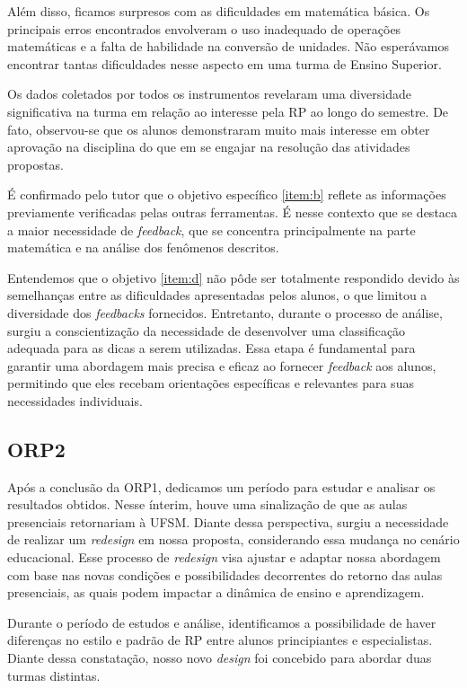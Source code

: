 Além disso, ficamos surpresos com as dificuldades em matemática básica. Os principais erros encontrados envolveram o uso inadequado de operações matemáticas e a falta de habilidade na conversão de unidades. Não esperávamos encontrar tantas dificuldades nesse aspecto em uma turma de Ensino Superior.

Os dados coletados por todos os instrumentos revelaram uma diversidade significativa na turma em relação ao interesse pela RP ao longo do semestre. De fato, observou-se que os alunos demonstraram muito mais interesse em obter aprovação na disciplina do que em se engajar na resolução das atividades propostas.

É confirmado pelo tutor que o objetivo específico \ref{item:b} reflete as informações previamente verificadas pelas outras ferramentas. É nesse contexto que se destaca a maior necessidade de \textit{feedback}, que se concentra principalmente na parte matemática e na análise dos fenômenos descritos.

Entendemos que o objetivo \ref{item:d} não pôde ser totalmente respondido devido às semelhanças entre as dificuldades apresentadas pelos alunos, o que limitou a diversidade dos \textit{feedbacks} fornecidos. Entretanto, durante o processo de análise, surgiu a conscientização da necessidade de desenvolver uma classificação adequada para as dicas a serem utilizadas. Essa etapa é fundamental para garantir uma abordagem mais precisa e eficaz ao fornecer \textit{feedback} aos alunos, permitindo que eles recebam orientações específicas e relevantes para suas necessidades individuais.


\subsection{ORP2} \label{sec:2orp}

Após a conclusão da ORP1, dedicamos um período para estudar e analisar os resultados obtidos. Nesse ínterim, houve uma sinalização de que as aulas presenciais retornariam à UFSM. Diante dessa perspectiva, surgiu a necessidade de realizar um \textit{redesign} em nossa proposta, considerando essa mudança no cenário educacional. Esse processo de \textit{redesign} visa ajustar e adaptar nossa abordagem com base nas novas condições e possibilidades decorrentes do retorno das aulas presenciais, as quais podem impactar a dinâmica de ensino e aprendizagem.

Durante o período de estudos e análise, identificamos a possibilidade de haver diferenças no estilo e padrão de RP entre alunos principiantes e especialistas. Diante dessa constatação, nosso novo \textit{design} foi concebido para abordar duas turmas distintas.

